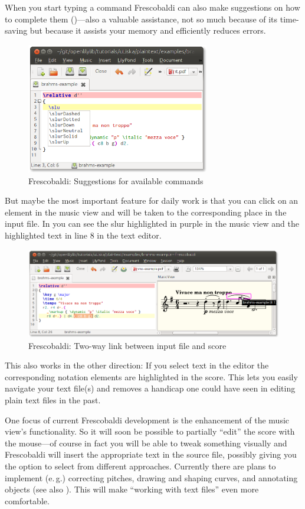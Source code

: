 \documentclass[DIV=12]{scrreprt}
\begin{document}
When you start typing a command Frescobaldi can also make suggestions on how to complete them ()---also a valuable assistance, not so much because of its time-saving but because it assists your memory and efficiently reduces errors.

\begin{figure}
\centering
\includegraphics[width=8cm]{examples/frescobaldi/code-completion}
\caption{Frescobaldi: Suggestions for available commands}
\label{fig:pt_fb-code-completion}
\end{figure}

But maybe the most important feature for daily work is that you can click on an element in the music view and will be taken to the corresponding place in the input file.
In  you can see the slur highlighted in purple in the music view and the highlighted text in line 8 in the text editor.
\begin{figure}
\centering
\includegraphics[max width=\textwidth]{examples/frescobaldi/point-and-click}
\caption{Frescobaldi: Two-way link between input file and score}
\label{fig:pt_fb-point-and-click}
\end{figure}
This also works in the other direction: If you select text in the editor the corresponding notation elements are highlighted in the score.
This lets you easily navigate your text file(s) and removes a handicap one could have seen in editing plain text files in the past.

One focus of current Frescobaldi development is the enhancement of the music view's functionality.
So it will soon be possible to partially “edit” the score with the mouse---of course in fact you will be able to tweak something visually and Frescobaldi will insert the appropriate text in the source file, possibly giving you the option to select from different approaches.
Currently there are plans to implement (e.\,g.) correcting pitches, drawing and shaping curves, and annotating objects (see also ).
This will make “working with text files” even more comfortable.
\end{document}
